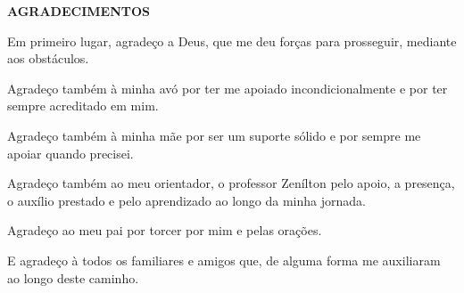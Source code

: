 \begin{center}
	\normalsize
	\textbf{AGRADECIMENTOS}
	
	Em primeiro lugar, agradeço a Deus, que me deu forças para prosseguir, mediante aos obstáculos.
	
	Agradeço também à minha avó por ter me apoiado incondicionalmente e por ter sempre acreditado em mim.
	
	Agradeço também à minha mãe por ser um suporte sólido e por sempre me apoiar quando precisei.
	
	Agradeço também ao meu orientador, o professor Zenílton pelo apoio, a presença, o auxílio prestado e pelo aprendizado ao longo da minha jornada.
	
	Agradeço ao meu pai por torcer por mim e pelas orações.
	
	E agradeço à todos os familiares e amigos que, de alguma forma me auxiliaram ao longo deste caminho.
\end{center}

 